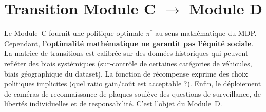 \section{Transition Module C $\rightarrow$ Module D}
\label{sec:c:transition_d}

Le Module~C fournit une politique optimale $\pi^*$ au sens math\'{e}matique
du MDP. Cependant, \textbf{l'optimalit\'{e} math\'{e}matique ne garantit pas
l'\'{e}quit\'{e} sociale}. La matrice de transitions est calibr\'{e}e sur des
donn\'{e}es historiques qui peuvent refl\'{e}ter des biais syst\'{e}miques
(sur-contr\^{o}le de certaines cat\'{e}gories de v\'{e}hicules, biais
g\'{e}ographique du dataset). La fonction de r\'{e}compense exprime des
choix politiques implicites (quel ratio gain/co\^{u}t est acceptable ?).
Enfin, le d\'{e}ploiement de cam\'{e}ras de reconnaissance de plaques soul\`{e}ve
des questions de surveillance, de libert\'{e}s individuelles et de
responsabilit\'{e}. C'est l'objet du Module~D.
